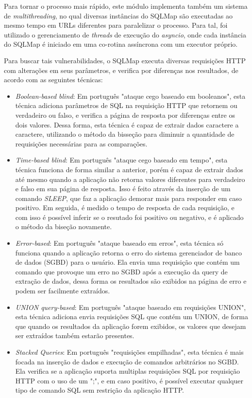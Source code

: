     Para tornar o processo mais rápido, este módulo implementa também um sistema de \textit{multithreading}, no qual diversas instâncias do SQLMap são executadas ao mesmo tempo em URLs diferentes para paralelizar o processo. Para tal, foi utilizado o gerenciamento de \textit{threads} de execução do \textit{asyncio}, onde cada instância do SQLMap é iniciado em uma co-rotina assíncrona com um executor próprio.
    
    Para buscar tais vulnerabilidades, o SQLMap executa diversas requisições HTTP com alterações em seus parâmetros, e verifica por diferenças nos resultados, de acordo com as seguintes técnicas:
    
    \label{item:sqlmap}
    \begin{itemize}
        \item \emph{Boolean-based blind}: Em português "ataque cego baseado em booleanos", esta técnica adiciona parâmetros de SQL na requisição HTTP que retornem ou verdadeiro ou falso, e verifica a página de resposta por diferenças entre os dois valores. Dessa forma, esta técnica é capaz de extrair dados caractere a caractere, utilizando o método da bisseção para diminuir a quantidade de requisições necessárias para as comparações.
        
        \item \emph{Time-based blind}: Em português "ataque cego baseado em tempo", esta técnica funciona de forma similar a anterior, porém é capaz de extrair dados até mesmo quando a aplicação não retorna valores diferentes para verdadeiro e falso em sua página de resposta. Isso é feito através da inserção de um comando \textit{SLEEP}, que faz a aplicação demorar mais para responder em caso positivo. Em seguida, é medido o tempo de resposta de cada requisição, e com isso é possível inferir se o resutado foi positivo ou negativo, e é aplicado o método da biseção novamente.
        
        \item \emph{Error-based}: Em português "ataque baseado em erros", esta técnica só funciona quando a aplicação retorna o erro do sistema gerenciador de banco de dados (SGBD) para o usuário. Ela envia uma requisição que contém um comando que provoque um erro no SGBD após a execução da query de extração de dados, dessa forma os resultados são exibidos na página de erro e podem ser facilmente extraídos.
        
        \item \emph{UNION query-based}: Em português "ataque baseado em requisições UNION", esta técnica adiciona envia requisições SQL que contém um UNION, de forma que quando os resultados da aplicação forem exibidos, os valores que desejam ser extraídos também estarão presentes. 
        
        \item \emph{Stacked Queries}: Em português "requisições empilhadas", esta técnica é mais focada na inserção de dados e execução de comandos arbitrários no SGBD. Ela verifica se a aplicação suporta multiplas requisições SQL por requisição HTTP com o uso de um ";", e em caso positivo, é possível executar qualquer tipo de comando SQL sem restrição da aplicação HTTP.
    \end{itemize}
    
